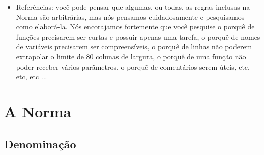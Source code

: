 \documentclass{42-pt}
\begin{document}
\begin{itemize}
    \item Referências: você pode pensar que algumas, ou todas, as regras
      inclusas na Norma são arbitrárias, mas nós pensamos cuidadosamente e
      pesquisamos como elaborá-la. Nós encorajamos fortemente que você
      pesquise o porquê de funções precisarem ser curtas e possuir apenas
      uma tarefa, o porquê de nomes de variáveis precisarem ser
      compreensíveis, o porquê de linhas não poderem extrapolar o limite
      de 80 colunas de largura, o porquê de uma função não poder receber
      vários parâmetros, o porquê de comentários serem úteis, etc, etc,
      etc ...


    \end{itemize}


\newpage

\chapter{A Norma}


    \section{Denominação}
\end{document}
